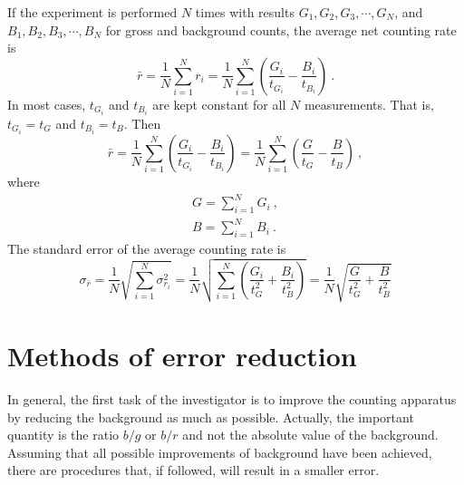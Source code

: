 \documentclass[12pt,a4paper]{article}
\begin{document}
If the experiment is performed $N$ times with results $G_1, G_2, G_3, \cdots, G_N$, and $B_1, B_2, B_3, \cdots, B_N$ for gross and background counts, the average net counting rate is
\begin{equation}
\bar{r} = \dfrac{1}{N} \sum\limits_{i=1}^N r_i = \dfrac{1}{N} \sum\limits_{i=1}^N \left(\dfrac{G_i}{t_{G_i}} -\dfrac{B_i}{t_{B_i}} \right) ~.
\end{equation}
In most cases, $t_{G_i}$ and $t_{B_i}$ are kept constant for all $N$ measurements. That is, $t_{G_i} = t_G$ and $t_{B_i} = t_B$. Then
\begin{equation}
\bar{r} = \dfrac{1}{N} \sum\limits_{i=1}^N \left(\dfrac{G_i}{t_{G_i}} -\dfrac{B_i}{t_{B_i}} \right) = \dfrac{1}{N} \sum\limits_{i=1}^N \left(\dfrac{G}{t_{G}} -\dfrac{B}{t_{B}} \right) ~,
\end{equation}
where
\begin{align}
G = \sum\limits_{i=1}^N G_i ~, \\
B = \sum\limits_{i=1}^N B_i ~.
\end{align}
The standard error of the average counting rate is
\begin{equation}
\sigma_{\bar{r}} = \dfrac{1}{N} \sqrt{\sum\limits_{i=1}^N \sigma^2_{r_i} } =  \dfrac{1}{N} \sqrt{\sum\limits_{i=1}^N \left(\dfrac{G_i}{t^2_{G}} +\dfrac{B_i}{t^2_{B}} \right)} = \dfrac{1}{N} \sqrt{\dfrac{G}{t^2_{G}} +\dfrac{B}{t^2_{B}}}
\end{equation}
























\section{Methods of error reduction}
 In general, the first task of the investigator is to improve the counting apparatus by reducing the background as much as possible. Actually, the important quantity is the ratio $b/g$ or $b/r$ and not the absolute value of the background. Assuming that all possible improvements of background have been achieved, there are procedures that, if followed, will result in a smaller error.
\end{document}
